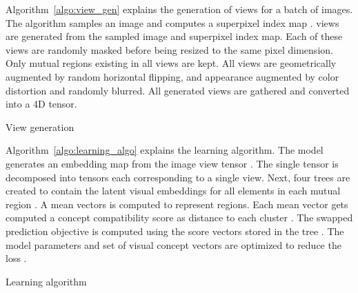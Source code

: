 \documentclass{bmvc2k}
\begin{document}
Algorithm~\ref{algo:view_gen} explains the generation of  views for a batch of  images. The algorithm samples an image  and computes a superpixel index map .  views are generated from the sampled image and superpixel index map. Each of these views are randomly masked before being resized to the same pixel dimension. Only mutual regions existing in all views are kept. All views are geometrically augmented by random horizontal flipping, and appearance augmented by color distortion and randomly blurred. All generated views are gathered and converted into a 4D tensor.

\begin{algorithm}
\caption{View generation}
\label{algo:view_gen}
\begin{algorithmic}
\State  {}
\State 
\For{}
    \State  {}
    \State 
    \State 
    \State 
    \State 
    \State 
    \State 
    \State 
    \State 
    \State 
    \State 
    \State 
    \State 
    \State 
    \State  {}
    \State 
\EndFor
\State  \Comment{}
\State  \Comment{}
\end{algorithmic}
\end{algorithm}

Algorithm~\ref{algo:learning_algo} explains the learning algorithm. The model  generates an embedding map  from the image view tensor . The single tensor  is decomposed into  tensors  each corresponding to a single view. Next, four trees are created to contain the latent visual embeddings  for all elements in each mutual region . A mean vectors  is computed to represent regions. Each mean vector gets computed a concept compatibility score  as distance to each cluster . The swapped prediction objective is computed using the score vectors  stored in the tree . The model parameters  and set of visual concept vectors  are optimized to reduce the loss .

\begin{algorithm}
\caption{Learning algorithm}
\label{algo:learning_algo}
\begin{algorithmic}
\State 
\State  \Comment{}
\State 
\State 
\State 
\State  {}
\State 
\State 
\For{}
    \State  \Comment{}
\State  \Comment{}
    \State 
    \State 
    \For{}
        \State 
        \State 
        \State 
        \State 
        \State 
        \State 
        \State 
        \State 
        \State 
    \EndFor
\EndFor
\State 
\State 
\State 
\State 
\end{algorithmic}
\end{algorithm}
\end{document}

